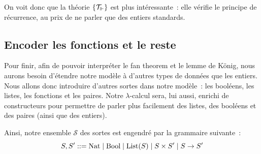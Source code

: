 \documentclass{article}
\begin{document}
On voit donc que la théorie $\{\mathcal T_\Vdash\}$ est plus intéressante~: elle vérifie le principe de récurrence, au prix de ne parler que des entiers standards.

\subsection{Encoder les fonctions et le reste}

Pour finir, afin de pouvoir interpréter le fan theorem et le lemme de König, nous aurons besoin d’étendre notre modèle à d’autres types de données que les entiers. Nous allons donc introduire d'autres sortes dans notre modèle~: les booléens, les listes, les fonctions et les paires. Notre $\lambda$-calcul sera, lui aussi, enrichi de constructeurs pour permettre de parler plus facilement des listes, des booléens et des paires (ainsi que des entiers).

Ainsi, notre ensemble $\mathcal S$ des sortes est engendré par la grammaire suivante~:
\[S,S' ::= \mathrm{Nat}\mid\mathrm{Bool}\mid\mathrm{List}(S)\mid S\times S'\mid S\to S'\]
\end{document}
